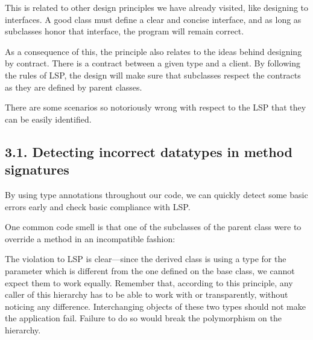 \documentclass[a4paper,10pt,english]{sphinxmanual}
\begin{document}
This is related to other design principles we have already visited, like designing to
interfaces. A good class must define a clear and concise interface, and as long as subclasses
honor that interface, the program will remain correct.

As a consequence of this, the principle also relates to the ideas behind designing by
contract. There is a contract between a given type and a client. By following the rules of
LSP, the design will make sure that subclasses respect the contracts as they are defined by
parent classes.

There are some scenarios so notoriously wrong with respect to the LSP that they can be
easily identified.


\subsection{3.1. Detecting incorrect datatypes in method signatures}
\label{\detokenize{chapters/4_solid_principles/index:detecting-incorrect-datatypes-in-method-signatures}}
By using type annotations throughout our code, we can quickly detect some basic errors early and check basic
compliance with LSP.

One common code smell is that one of the subclasses of the parent class were to override a method in an incompatible
fashion:

\begin{sphinxVerbatim}[commandchars=\\\{\}]
 
         
         

 

         
         
\end{sphinxVerbatim}

The violation to LSP is clear—since the derived class is using a type for the 
parameter which is different from the one defined on the base class, we cannot expect them
to work equally. Remember that, according to this principle, any caller of this hierarchy has
to be able to work with  or  transparently, without noticing any
difference. Interchanging objects of these two types should not make the application fail.
Failure to do so would break the polymorphism on the hierarchy.
\end{document}

